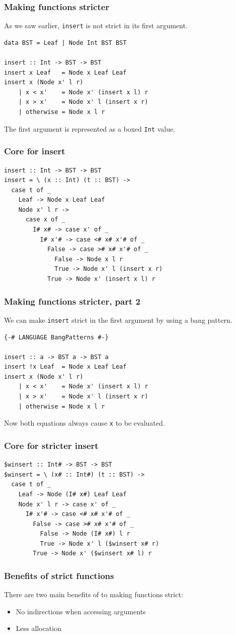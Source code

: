 \documentclass{beamer}
\begin{document}
\begin{frame}[fragile]
  \frametitle{Making functions stricter}

  As we saw earlier, \lstinline!insert! is not strict in its first
  argument.
  \begin{lstlisting}
data BST = Leaf | Node Int BST BST

insert :: Int -> BST -> BST
insert x Leaf   = Node x Leaf Leaf
insert x (Node x' l r)
    | x < x'    = Node x' (insert x l) r
    | x > x'    = Node x' l (insert x r)
    | otherwise = Node x l r
  \end{lstlisting}
  The first argument is represented as a boxed \lstinline!Int! value.
\end{frame}

\begin{frame}[fragile]
  \frametitle{Core for insert}

  \begin{verbatim}
insert :: Int -> BST -> BST
insert = \ (x :: Int) (t :: BST) ->
  case t of _
    Leaf -> Node x Leaf Leaf
    Node x' l r ->
      case x of _
        I# x# -> case x' of _
          I# x'# -> case <# x# x'# of _
            False -> case ># x# x'# of _
              False -> Node x l r
              True -> Node x' l (insert x r)
            True -> Node x' (insert x l) r
  \end{verbatim}
\end{frame}

\begin{frame}[fragile]
  \frametitle{Making functions stricter, part 2}

  We can make \lstinline!insert! strict in the first argument by
  using a bang pattern.
  \begin{lstlisting}
{-# LANGUAGE BangPatterns #-}

insert :: a -> BST a -> BST a
insert !x Leaf  = Node x Leaf Leaf
insert x (Node x' l r)
    | x < x'    = Node x' (insert x l) r
    | x > x'    = Node x' l (insert x r)
    | otherwise = Node x l r
  \end{lstlisting}
  Now both equations always cause \lstinline!x! to be evaluated.
\end{frame}

\begin{frame}[fragile]
  \frametitle{Core for stricter insert}

  \begin{verbatim}
$winsert :: Int# -> BST -> BST
$winsert = \ (x# :: Int#) (t :: BST) ->
  case t of _
    Leaf -> Node (I# x#) Leaf Leaf
    Node x' l r -> case x' of _
      I# x'# -> case <# x# x'# of _
        False -> case ># x# x'# of _
          False -> Node (I# x#) l r
          True -> Node x' l ($winsert x# r)
        True -> Node x' ($winsert x# l) r
  \end{verbatim}
\end{frame}

\begin{frame}[fragile]
  \frametitle{Benefits of strict functions}

  There are two main benefits of to making functions strict:
  \begin{itemize}
  \item No indirections when accessing arguments
  \item Less allocation
  \end{itemize}
\end{frame}
\end{document}
